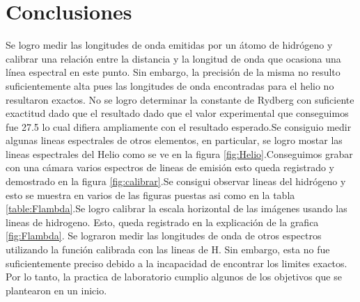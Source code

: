 \documentclass[a4paper, amsfonts, amssymb, amsmath, reprint, showkeys, nofootinbib, twoside]{revtex4-1}
\begin{document}
\section{Conclusiones}

Se logro medir las longitudes de onda emitidas por un átomo de hidrógeno y calibrar una relación entre la distancia y la longitud de onda que ocasiona una línea espectral en este punto. Sin embargo, la precisión de la misma no resulto suficientemente alta pues las longitudes de onda encontradas para el helio no resultaron exactos. No se logro determinar la constante de Rydberg con suficiente exactitud dado que el resultado dado que el valor experimental que conseguimos fue 27.5 lo cual difiera ampliamente con el resultado esperado.Se consiguio medir algunas lineas espectrales de otros elementos, en particular, se logro mostar las lineas espectrales del Helio como se ve en la figura \ref{fig:Helio}.Conseguimos grabar con una cámara varios espectros de lineas de emisión esto queda registrado y demostrado en la figura \ref{fig:calibrar}.Se consigui observar lineas del hidrógeno y esto se muestra en varios de las figuras puestas asi como en la tabla \ref{table:Flambda}.Se logro calibrar la escala horizontal de las imágenes usando las lineas de hidrogeno. Esto, queda registrado en la explicación de la grafica \ref{fig:Flambda}. Se lograron medir las longitudes de onda de otros espectros utilizando la función calibrada con las lineas de H. Sin embargo, esta no fue suficientemente preciso debido a la incapacidad de encontrar los limites exactos. Por lo tanto, la practica de laboratorio cumplio algunos de los objetivos que se plantearon en un inicio.



\end{document}
